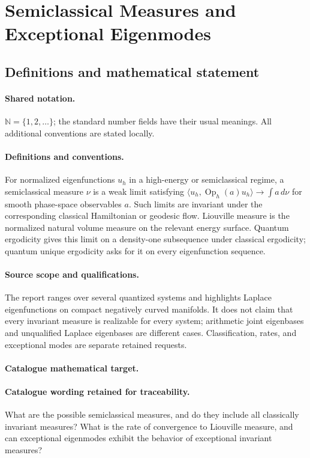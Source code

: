 \documentclass[11pt]{article}
\begin{document}
\section{Semiclassical Measures and Exceptional Eigenmodes}\label{statement}

\subsection{Definitions and mathematical statement}

\paragraph{Shared notation.}$\mathbb N=\{1,2,\ldots\}$; the standard number fields have their usual meanings. All additional conventions are stated locally.


\paragraph{Definitions and conventions.} For normalized eigenfunctions $u_h$ in a high-energy or semiclassical regime, a semiclassical measure $\nu$ is a weak limit satisfying $\langle u_h,\operatorname{Op}_h(a)u_h\rangle\to\int a\,d\nu$ for smooth phase-space observables $a$. Such limits are invariant under the corresponding classical Hamiltonian or geodesic flow. Liouville measure is the normalized natural volume measure on the relevant energy surface. Quantum ergodicity gives this limit on a density-one subsequence under classical ergodicity; quantum unique ergodicity asks for it on every eigenfunction sequence.

\paragraph{Source scope and qualifications.} The report ranges over several quantized systems and highlights Laplace eigenfunctions on compact negatively curved manifolds. It does not claim that every invariant measure is realizable for every system; arithmetic joint eigenbases and unqualified Laplace eigenbases are different cases. Classification, rates, and exceptional modes are separate retained requests.

\paragraph{Catalogue mathematical target.}
\paragraph{Catalogue wording retained for traceability.}
What are the possible semiclassical measures, and do they include all classically invariant measures? What is the rate of convergence to Liouville measure, and can exceptional eigenmodes exhibit the behavior of exceptional invariant measures?
\end{document}
